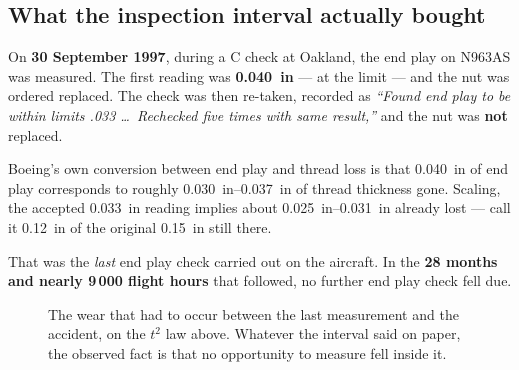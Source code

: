 \documentclass[11pt,a4paper]{article}
\begin{document}
\subsection{What the inspection interval actually bought}

On \textbf{30 September 1997}, during a C check at Oakland, the end play on N963AS was measured.
The first reading was \textbf{\SI{0.040}{in}} --- at the limit --- and the nut was ordered replaced.
The check was then re-taken, recorded as \emph{``Found end play to be within limits .033 \dots\
Rechecked five times with same result,''} and the nut was \textbf{not} replaced.

\medskip
Boeing's own conversion between end play and thread loss is that \SI{0.040}{in} of end play
corresponds to roughly \SIrange{0.030}{0.037}{in} of thread thickness gone. Scaling, the accepted
\SI{0.033}{in} reading implies about \SIrange{0.025}{0.031}{in} already lost --- call it
\SI{0.12}{in} of the original \SI{0.15}{in} still there.

\medskip
That was the \emph{last} end play check carried out on the aircraft. In the
\textbf{28 months and nearly 9\,000 flight hours} that followed, no further end play check fell due.

\begin{figure}[H]\centering
\resizebox{\textwidth}{!}{}
\caption{The wear that had to occur between the last measurement and the accident, on the
$t^{2}$ law above. Whatever the interval said on paper, the observed fact is that no opportunity to
measure fell inside it.}
\label{fig:interval}
\end{figure}
\end{document}
